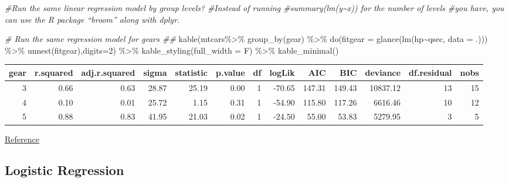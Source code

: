 \documentclass[
]{article}
\newenvironment{Shaded}{\begin{snugshade}}{\end{snugshade}}
\newcommand{\AttributeTok}[1]{\textcolor[rgb]{0.77,0.63,0.00}{#1}}
\newcommand{\CommentTok}[1]{\textcolor[rgb]{0.56,0.35,0.01}{\textit{#1}}}
\newcommand{\DecValTok}[1]{\textcolor[rgb]{0.00,0.00,0.81}{#1}}
\newcommand{\FunctionTok}[1]{\textcolor[rgb]{0.00,0.00,0.00}{#1}}
\newcommand{\NormalTok}[1]{#1}
\newcommand{\SpecialCharTok}[1]{\textcolor[rgb]{0.00,0.00,0.00}{#1}}
\begin{document}
\begin{Shaded}
\begin{Highlighting}[]
\CommentTok{\#Run the same linear regression model by group levels? }
\CommentTok{\#Instead of running \#summary(lm(y\textasciitilde{}x)) for the number of levels }
\CommentTok{\#you have, you can use the R package “broom” along with dplyr.}

\CommentTok{\# Run the same regression model for gears \#\#}
\FunctionTok{kable}\NormalTok{(mtcars}\SpecialCharTok{\%\textgreater{}\%} \FunctionTok{group\_by}\NormalTok{(gear) }\SpecialCharTok{\%\textgreater{}\%}
  \FunctionTok{do}\NormalTok{(}\AttributeTok{fitgear =} \FunctionTok{glance}\NormalTok{(}\FunctionTok{lm}\NormalTok{(hp}\SpecialCharTok{\textasciitilde{}}\NormalTok{qsec, }\AttributeTok{data =}\NormalTok{ .))) }\SpecialCharTok{\%\textgreater{}\%} 
  \FunctionTok{unnest}\NormalTok{(fitgear),}\AttributeTok{digits=}\DecValTok{2}\NormalTok{) }\SpecialCharTok{\%\textgreater{}\%}   \FunctionTok{kable\_styling}\NormalTok{(}\AttributeTok{full\_width =}\NormalTok{ F) }\SpecialCharTok{\%\textgreater{}\%} 
  \FunctionTok{kable\_minimal}\NormalTok{()}
\end{Highlighting}
\end{Shaded}

\begin{table}
\centering
\begin{tabular}{r|r|r|r|r|r|r|r|r|r|r|r|r}
\hline
gear & r.squared & adj.r.squared & sigma & statistic & p.value & df & logLik & AIC & BIC & deviance & df.residual & nobs\\
\hline
3 & 0.66 & 0.63 & 28.87 & 25.19 & 0.00 & 1 & -70.65 & 147.31 & 149.43 & 10837.12 & 13 & 15\\
\hline
4 & 0.10 & 0.01 & 25.72 & 1.15 & 0.31 & 1 & -54.90 & 115.80 & 117.26 & 6616.46 & 10 & 12\\
\hline
5 & 0.88 & 0.83 & 41.95 & 21.03 & 0.02 & 1 & -24.50 & 55.00 & 53.83 & 5279.95 & 3 & 5\\
\hline
\end{tabular}
\end{table}

\href{https://stackoverflow.com/questions/22713325/fitting-several-regression-models-with-dplyr}{Reference}

\hypertarget{logistic-regression}{%
\subsection{Logistic Regression}\label{logistic-regression}}
\end{document}
